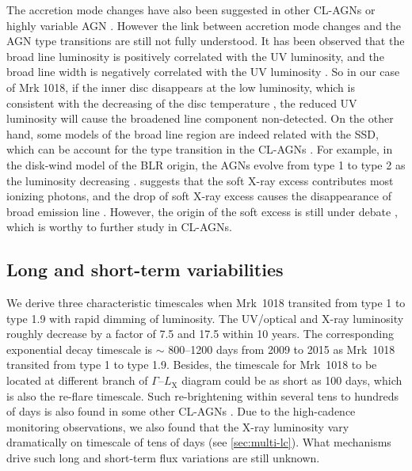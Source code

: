 \documentclass[twocolumn]{aastex63}
\begin{document}




The accretion mode changes have also been suggested in other CL-AGNs or highly variable AGN \citep{2019arXiv191203972L,2020ApJ...890L..29A,2020MNRAS.492.2335L}. However the link between accretion mode changes and the AGN type transitions are still not fully understood. It has been observed that the broad line luminosity is positively correlated with the UV luminosity, and the broad line width is negatively correlated with the UV luminosity \citep[e.g.][]{2019ApJ...885...44D}. So in our case of Mrk 1018, if the inner disc disappears at the low luminosity, which is consistent with the decreasing of the disc temperature \citep[see also ][]{2018MNRAS.480.3898N}, the reduced UV luminosity will cause the broadened line component non-detected. On the other hand, some models of the broad line region are indeed related with the SSD, which can be account for the type transition in the CL-AGNs \citep[see a recent review in ][]{2019OAst...28..200C}. For example, in the disk-wind model of the BLR origin, the AGNs evolve from type 1 to type 2 as the luminosity decreasing \citep[see][]{2014MNRAS.438.3340E}. \citet{2018MNRAS.480.3898N} suggests that the soft X-ray excess contributes most ionizing photons, and the drop of soft X-ray excess causes the disappearance of broad emission line \citep[see also in ][]{2020MNRAS.492.2335L}. However, the origin of the soft excess is still under debate \citep[e.g.][]{2018A&A...611A..59P}, which is worthy to further study in CL-AGNs. 




 




\subsection{Long and short-term variabilities}

We derive three characteristic timescales when Mrk~1018 transited from type 1 to type 1.9 with rapid dimming of luminosity. The UV/optical and X-ray luminosity roughly decrease by a factor of 7.5 and 17.5 within 10 years. The corresponding exponential decay timescale is $\sim$ 800--1200 days from 2009 to 2015 as Mrk~1018 transited from type 1 to type 1.9. Besides, the timescale for Mrk~1018 to be located at different branch of $\Gamma$--$L_\mathrm{X}$ diagram could be as short as 100 days, which is also the re-flare timescale. Such re-brightening within several tens to hundreds of days is also found in some other CL-AGNs \citep[e.g.][and references therein]{2017MNRAS.467.1496O,2019MNRAS.487.4057K,2020MNRAS.498..718O}. Due to the high-cadence monitoring observations, we also found that the X-ray luminosity vary dramatically on timescale of tens of days (see \autoref{sec:multi-lc}). What mechanisms drive such long and short-term flux variations are still unknown. 
\end{document}

